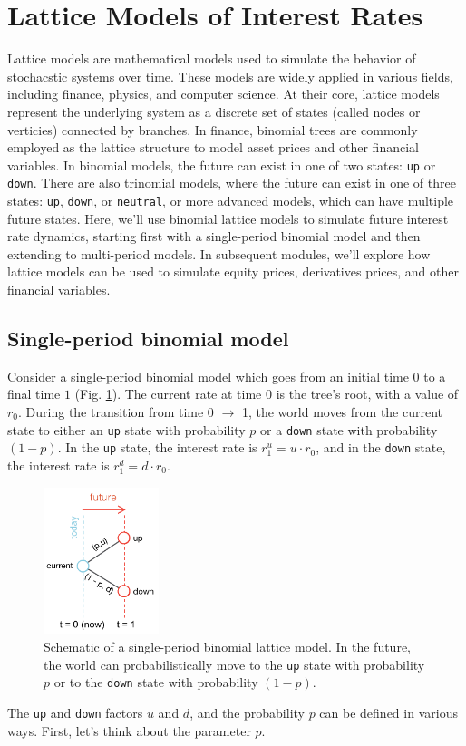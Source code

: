 \documentclass[11pt]{article}
\theoremstyle{definition}
\begin{document}
\clearpage

\section{Lattice Models of Interest Rates}
Lattice models are mathematical models used to simulate the behavior of stochacstic systems over time. 
These models are widely applied in various fields, including finance, physics, and computer science. 
At their core, lattice models represent the underlying system as a discrete set 
of states (called nodes or verticies) connected by branches. 
In finance, binomial trees are commonly employed as the lattice structure to model asset prices and other financial variables. 
In binomial models, the future can exist in one of two states: \texttt{up} or \texttt{down}.
There are also trinomial models, where the future can exist in one of three states: \texttt{up}, \texttt{down}, or \texttt{neutral}, 
or more advanced models, which can have multiple future states.
Here, we'll use binomial lattice models to simulate future interest rate dynamics, starting first with a single-period binomial 
model and then extending to multi-period models. 
In subsequent modules, we'll explore how lattice models can be used to simulate equity prices, derivatives prices, and other financial variables.

\subsection{Single-period binomial model}
Consider a single-period binomial model which goes from an initial time $0$ to a final time $1$ (Fig. \ref{fig:example-oneste-binomial-lattice-schematic}).
The current rate at time $0$ is the tree's root, with a value of $r_{0}$.
During the transition from time 0 $\rightarrow$ 1, the world moves 
from the current state to either an \texttt{up} state with probability $p$ or a \texttt{down} state with probability $(1-p)$.
In the \texttt{up} state, the interest rate is $r_{1}^{u} = u\cdot{r_{0}}$, 
and in the \texttt{down} state, the interest rate is $r_{1}^{d} = d\cdot{r_{0}}$.
\begin{figure}[h]
    \centering
    \includegraphics[width=0.30\textwidth]{./figs/Fig-OneStep-Binomial-Lattice-Schematic.pdf}
    \caption{Schematic of a single-period binomial lattice model. 
	In the future, the world can probabilistically move to the \texttt{up} state with probability $p$ or to the \texttt{down} state with probability $(1-p)$. 
	}\label{fig:example-oneste-binomial-lattice-schematic}
\end{figure}
The \texttt{up} and \texttt{down} factors $u$ and $d$, and the probability $p$ can be defined in various ways. 
First, let's think about the parameter $p$.
\end{document}
